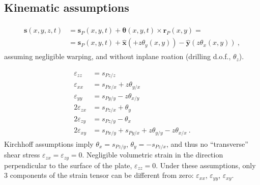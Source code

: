 \documentclass[letterpaper,10pt,english]{jupyterBook}
\begin{document}
\subsection{Kinematic assumptions}
\label{\detokenize{ch/solids/plates-shells/timoshenko:kinematic-assumptions}}\label{\detokenize{ch/solids/plates-shells/timoshenko:solid-mechanics-small-displacements-plates-shells-kirchhoff-assumptions}}
\sphinxAtStartPar
{}
\begin{equation*}
\begin{split}\begin{aligned}
  \mathbf{s}(x,y,z,t)
  & = \mathbf{s}_P(x,y,t) + \boldsymbol{\theta}(x,y,t) \times \mathbf{r}_P(x,y) = \\ 
  & = \mathbf{s}_P(x,y,t) + \hat{\mathbf{x}} \left( + z \theta_y(x,y) \right) - \hat{\mathbf{y}} \left( z \theta_x(x,y) \right) \ ,
\end{aligned}\end{split}
\end{equation*}
\sphinxAtStartPar
assuming negligible warping, and without in\sphinxhyphen{}plane roation (drilling d.o.f., \(\theta_z\)).

\sphinxAtStartPar
{}
\begin{equation*}
\begin{split}\begin{aligned}
   \varepsilon_{zz} & = s_{Pz/z} \\
   \varepsilon_{xx} & = s_{Px/x} + z \theta_{y/x} \\
   \varepsilon_{yy} & = s_{Py/y} - z \theta_{x/y} \\
 2 \varepsilon_{zx} & = s_{Pz/x} + \theta_y \\
 2 \varepsilon_{zy} & = s_{Pz/y} - \theta_x \\
 2 \varepsilon_{xy} & = s_{Px/y} + s_{Py/x} + z \theta_{y/y} - z \theta_{x/x} \ .
\end{aligned}\end{split}
\end{equation*}
\sphinxAtStartPar
Kirchhoff assumptions imply \(\theta_x = s_{Pz/y}\), \(\theta_y = -s_{Pz/x}\), and thus no “transverse” shear stress \(\varepsilon_{zx} = \varepsilon_{zy} = 0\). Negligible volumetric strain in the direction perpendicular to the surface of the plate, \(\varepsilon_{zz} = 0\). Under these assumptions, only 3 components of the strain tensor can be different from zero: \(\varepsilon_{xx}\), \(\varepsilon_{yy}\), \(\varepsilon_{xy}\).
\end{document}

